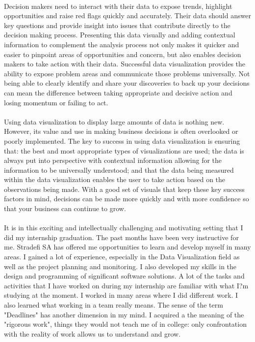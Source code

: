 \paragraph*{}
Decision makers need to interact with their data to expose trends, highlight opportunities and raise red flags quickly and accurately. Their data should answer key questions and provide insight into issues that contribute directly to the decision making process. Presenting this data visually and adding contextual information to complement the analysis process not only makes it quicker and easier to pinpoint areas of opportunities and concern, but also enables decision makers to take action with their data. Successful data visualization provides the ability to expose problem areas and communicate those problems universally. Not being able to clearly identify and share your discoveries to back up your decisions can mean the difference between taking appropriate and decisive action and losing momentum or failing to act.
\paragraph*{}
Using data visualization to display large amounts of data is nothing new. However, its value and use in making business decisions is often overlooked or poorly implemented. The key to success in using data visualization is ensuring that: the best and most appropriate types of visualizations are used; the data is always put into perspective with contextual information allowing for the information to be universally understood; and that the data being measured within the data visualization enables the user to take action based on the observations being made. With a good set of visuals that keep these key success factors in mind, decisions can be made more quickly and with more confidence so that your business can continue to grow.
\paragraph*{}
It is in this exciting and intellectually challenging and motivating setting that I did my internship graduation. The past months have been very instructive for me. Stradefi SA has offered me opportunities to learn and develop myself in many areas. I gained a lot of experience, especially in the Data Visualization field as well as the project planning and monitoring. I also developed my skills in the design and programming of significant software solutions. A lot of the tasks and activities that I have worked on during my internship are familiar with what I?m studying at the moment. I worked in many areas where I did different work.
I also learned what working in a team really means. The sense of the term "Deadlines" has another dimension in my mind. I acquired a the meaning of the "rigorous work", things they would not teach me of in college: only confrontation with the reality of work allows us to understand and grow. 